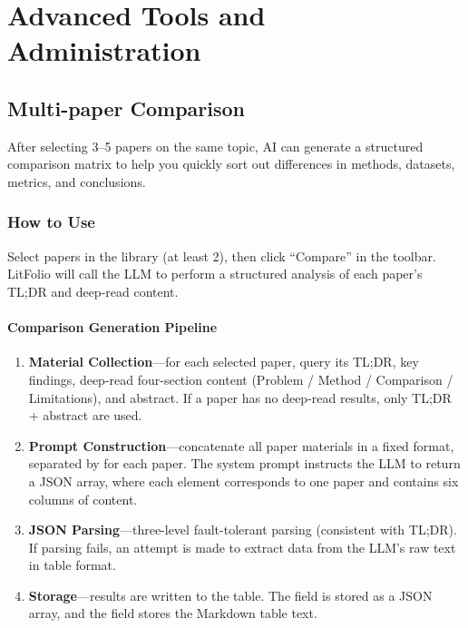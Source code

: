\part{Advanced Tools and Administration}

\chapter{Multi-paper Comparison}
\label{ch:compare}

After selecting 3--5 papers on the same topic, AI can generate a structured comparison
matrix to help you quickly sort out differences in methods, datasets, metrics, and conclusions.

\section{How to Use}

Select papers in the library (at least 2), then click ``Compare'' in the toolbar. LitFolio
will call the LLM to perform a structured analysis of each paper's TL;DR and deep-read content.


\subsection{Comparison Generation Pipeline}

\begin{enumerate}
  \item \textbf{Material Collection}---for each selected paper, query its TL;DR, key findings,
    deep-read four-section content (Problem / Method / Comparison / Limitations), and abstract.
    If a paper has no deep-read results, only TL;DR + abstract are used.
  \item \textbf{Prompt Construction}---concatenate all paper materials in a fixed format,
    separated by  for each paper. The system prompt instructs
    the LLM to return a JSON array, where each element corresponds to one paper and contains
    six columns of content.
  \item \textbf{JSON Parsing}---three-level fault-tolerant parsing (consistent with TL;DR).
    If parsing fails, an attempt is made to extract data from the LLM's raw text in table format.
  \item \textbf{Storage}---results are written to the  table.
    The  field is stored as a JSON array, and the  field stores
    the Markdown table text.
\end{enumerate}

